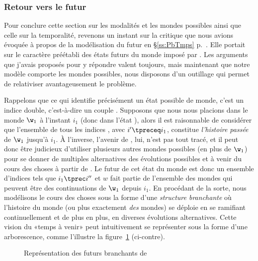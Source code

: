 \subsubsection{Retour vers le futur}
\label{s:branchants}

Pour conclure cette section sur les modalités et les mondes possibles ainsi que celle sur la temporalité, revenons un instant sur la critique que nous avions évoquée à propos de la modélisation du futur en \S\ref{ss:PbTmps} p.~\pageref{ss:PbTmps}.  Elle portait sur le caractère préétabli des états futurs du monde imposé par {\Tps}.  Les arguments que j'avais proposés pour y répondre valent toujours, mais maintenant que notre modèle comporte les mondes possibles, nous disposons d'un outillage qui permet de relativiser avantageusement le problème. 

Rappelons que ce qui identifie précisément un état possible de monde, c'est un indice double, c'est-à-dire un couple . Supposons que nous nous placions dans le monde $\w_1$ à l'instant $i_1$ (donc dans l'état ), alors il est raisonnable de considérer que l'ensemble de tous les indices , avec $i'\tpreceq i_1$, constitue \emph{l'histoire passée} de $\w_1$ jusqu'à $i_1$. 
À l'inverse, l'avenir de , lui, n'est pas tout tracé, et il peut donc être judicieux d'utiliser plusieurs autres mondes possibles (en plus de $\w_1$) pour se donner de multiples alternatives des évolutions possibles et à venir du cours des choses à partir de .  Le futur de cet état du monde est donc un ensemble d'indices  tels que $i_1\tprec i''$ et $w$ fait partie de l'ensemble des mondes qui peuvent être des continuations de $\w_1$ depuis $i_1$. En procédant de la sorte, nous modélisons le cours des choses sous la forme d'une \emph{structure branchante} où l'histoire du monde (ou plus exactement \emph{des} mondes) se déploie en se ramifiant continuellement et de plus en plus, en diverses évolutions alternatives. 
Cette vision du «temps à venir» peut intuitivement se représenter sous la forme d'une arborescence, comme l'illustre la figure~\ref{futurs1} (ci-contre).



\begin{figure}[h!]
\begin{center}
\scalebox{.9}{}%
\caption{Représentation des futurs branchants de }\label{futurs1}
\end{center}
\end{figure}

